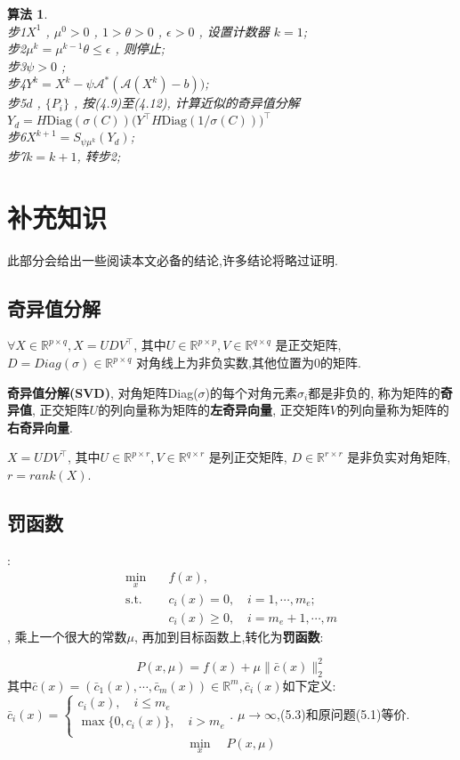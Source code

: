 \documentclass[UTF8]{ctexart}
\newtheorem{algo}{算法}
\newcommand{\s}{\quad}
\renewcommand{\b}{\textbf}
\newcommand{\p}{\paragraph{}\s}
\newcommand{\sect}{\section}
\newcommand{\ssect}{\subsection}
\newcommand{\equSplit}[1]{\begin{equation}\begin{split}#1\end{split}\end{equation}}
\newcommand{\equ}[1]{\begin{equation}#1\end{equation}}
\newcommand{\Tst}{\text{s.t.}\s}
\newcommand{\norm}[1]{\lVert#1\rVert}
\newcommand{\Real}[1]{\mathbb{R}^{#1}}
\numberwithin{equation}{section}
\begin{document}
			\begin{algo}
				\s\\
				步1 $X^1$ , $\mu^0 > 0$ , $1 > \theta > 0$ , $\epsilon > 0$ , 设置计数器 $k = 1$;\\
				步2 $\mu^k = \mu^{k -1} \theta \le \epsilon$ , 则停止;\\
				步3 $\psi > 0$ ;\\
				步4 $Y^k = X^k - \psi \mathcal{A}^*(\mathcal{A}(X^k) - b))$;\\
				步5 $d$ , $\{P_i\}$ , 按(4.9)至(4.12), 计算近似的奇异值分解 $Y_d = H \text{Diag}(\sigma(C)) \big(Y ^\top H \text{Diag}(1/\sigma(C))\big)^\top$\\
				步6 $X^{k+1} = S_{\psi \mu^k}(Y_d)$;\\
				步7\s$k = k + 1$, 转步2;
			\end{algo}
		


		
	\sect{补充知识}
		此部分会给出一些阅读本文必备的结论,许多结论将略过证明.
		\ssect{奇异值分解}
		$\forall X\in\Real{p\times q},X=UDV^\top$,
		其中$U\in\Real{p\times p},V\in\Real{q\times q}$
		是正交矩阵,
		$D=Diag(\sigma)\in\Real{p\times q}$
		对角线上为非负实数,其他位置为0的矩阵.

		\b{奇异值分解(SVD)},
		对角矩阵Diag($\sigma$)的每个对角元素$\sigma_i$都是非负的,
		称为矩阵的\b{奇异值},
		正交矩阵$U$的列向量称为矩阵的\b{左奇异向量},
		正交矩阵$V$的列向量称为矩阵的\b{右奇异向量}.

		$X=UDV^\top$,
		其中$U\in\Real{p\times r},V\in\Real{q\times r}$
		是列正交矩阵,
		$D\in\Real{r\times r}$
		是非负实对角矩阵,
		$r=rank(X)$.

		\ssect{罚函数}
		:
		\equSplit{
			\min_x\s&f(x),\\
			\Tst&c_i(x)=0,\s i=1,\cdots,m_e;\\
			&c_i(x)\geq 0,\s i=m_e+1,\cdots,m
		}
		,
		乘上一个很大的常数$\mu$,
		再加到目标函数上,转化为\b{罚函数}:

		\equ{P(x,\mu)=f(x)+\mu \norm{\bar{c}(x)}^2_2}
		其中$\bar{c}(x)=(\bar{c}_1(x),\cdots,\bar{c}_m(x))\in\Real{m}$,$\,\bar{c}_i(x)$如下定义:
		$\bar{c}_i(x)=
		\begin{cases}
			c_i(x),\s i\leq m_e       \\
			\max\{0,c_i(x)\},\s i>m_e \\
		\end{cases}
		$.
		$\mu\rightarrow\infty$,(5.3)和原问题(5.1)等价.
		\equ{\min_x\s P(x,\mu)}
\end{document}
